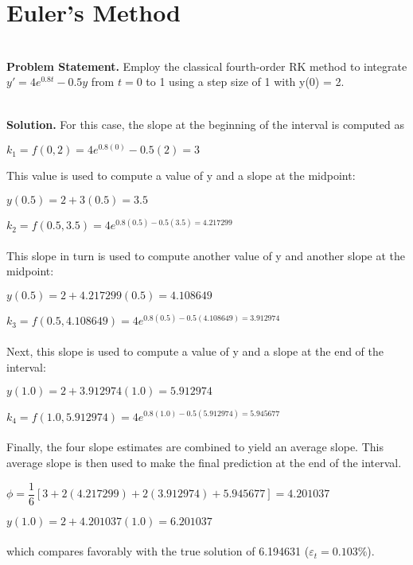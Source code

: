 \vspace{0,3in}
\chapter{Euler’s Method}
\vspace{0,1in}
\hline\\
\vspace{0,1in}
\textbf{Problem Statement.} Employ the classical fourth-order RK method to integrate $y' = 4e^{0.8t} - 0.5y$ from $t=0$ to 1 using a step size of 1 with y(0) = 2.

\vspace{0.2in}\\
\textbf{Solution.}  For this case, the slope at the beginning of the interval is computed as 

$k_1 = f(0,2) = 4e^{0.8(0)} - 0.5(2) = 3$

This value is used to compute a value of y and a slope at the midpoint:

$y(0.5) = 2 + 3(0.5) = 3.5$

$k_2 = f(0.5, 3.5) = 4e^{0.8(0.5) - 0.5(3.5) = 4.217299}$\\
\\
This slope in turn is used to compute another value of y and another slope at the midpoint:

$y(0.5) = 2 + 4.217299(0.5) = 4.108649$

$k_3 = f (0.5, 4.108649) = 4e^{0.8(0.5) − 0.5(4.108649) = 3.912974}$\\
\\
Next, this slope is used to compute a value of y and a slope at the end of the interval:

$y(1.0) = 2 + 3.912974(1.0) = 5.912974$

$k_4 = f (1.0, 5.912974) = 4e^{0.8(1.0) - 0.5(5.912974) = 5.945677}$\\
\\
Finally, the four slope estimates are combined to yield an average slope. This average slope
is then used to make the final prediction at the end of the interval.

$\phi = \dfrac{1}{6} [3 + 2(4.217299) + 2(3.912974) + 5.945677] = 4.201037$

$y(1.0) = 2 + 4.201037(1.0) = 6.201037$\\
\\
which compares favorably with the true solution of 6.194631 ($\varepsilon_{t} = 0.103\%$).
\hline\\

